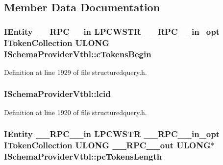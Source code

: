 \subsection{Member Data Documentation}
\subsubsection[{\texorpdfstring{c\+Tokens\+Begin}{cTokensBegin}}]{ {\bf I\+Entity} {\bf \+\_\+\+\_\+\+R\+P\+C\+\_\+\+\_\+in} {\bf L\+P\+C\+W\+S\+TR} {\bf \+\_\+\+\_\+\+R\+P\+C\+\_\+\+\_\+in\+\_\+opt} {\bf I\+Token\+Collection} {\bf U\+L\+O\+NG} I\+Schema\+Provider\+Vtbl\+::c\+Tokens\+Begin}\hypertarget{struct_i_schema_provider_vtbl_aa2fa2fa0f52632c194f4c0cb9c5504b9}{}\label{struct_i_schema_provider_vtbl_aa2fa2fa0f52632c194f4c0cb9c5504b9}


Definition at line 1929 of file structuredquery.\+h.

\subsubsection[{\texorpdfstring{lcid}{lcid}}]{ I\+Schema\+Provider\+Vtbl\+::lcid}\hypertarget{struct_i_schema_provider_vtbl_aac390dbf80610c525c3a99fcd3d87b04}{}\label{struct_i_schema_provider_vtbl_aac390dbf80610c525c3a99fcd3d87b04}


Definition at line 1920 of file structuredquery.\+h.

\subsubsection[{\texorpdfstring{pc\+Tokens\+Length}{pcTokensLength}}]{ {\bf I\+Entity} {\bf \+\_\+\+\_\+\+R\+P\+C\+\_\+\+\_\+in} {\bf L\+P\+C\+W\+S\+TR} {\bf \+\_\+\+\_\+\+R\+P\+C\+\_\+\+\_\+in\+\_\+opt} {\bf I\+Token\+Collection} {\bf U\+L\+O\+NG} {\bf \+\_\+\+\_\+\+R\+P\+C\+\_\+\+\_\+out} {\bf U\+L\+O\+NG}$\ast$ I\+Schema\+Provider\+Vtbl\+::pc\+Tokens\+Length}\hypertarget{struct_i_schema_provider_vtbl_a1e163eb0c1fd144861e8538f450ed853}{}\label{struct_i_schema_provider_vtbl_a1e163eb0c1fd144861e8538f450ed853}


